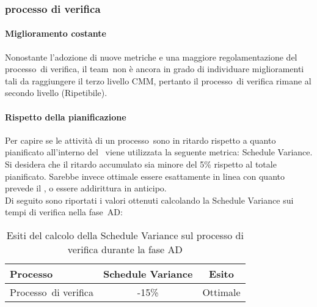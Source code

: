 \documentclass[../PianoDiQualifica.tex]{subfiles}
\begin{document}
\begin{appendices}
		\subsubsection{processo di verifica}
			\paragraph{Miglioramento costante}
			Nonostante l'adozione di nuove metriche e una maggiore regolamentazione del processo\g\ di verifica, il team\g\ non è ancora in grado di individuare miglioramenti tali da raggiungere il terzo livello CMM\g, pertanto il processo\g\ di verifica rimane al secondo livello (Ripetibile).
			
			\paragraph{Rispetto della pianificazione}
			Per capire se le attività di un processo\g\ sono in ritardo rispetto a quanto pianificato all’interno del \pianodiprogetto\ viene utilizzata la seguente metrica: Schedule Variance.\\
			Si desidera che il ritardo accumulato sia minore del 5\% rispetto al totale pianificato. Sarebbe invece ottimale essere esattamente in linea con quanto prevede il \pianodiprogetto, o essere addirittura in anticipo.\\
			Di seguito sono riportati i valori ottenuti calcolando la Schedule Variance sui tempi di verifica nella fase\g\ AD:
			\begin{table}[H]
				\centering
				\begin{tabular}{l * {2}{c}}
					\toprule
					\textbf{Processo} & \textbf{Schedule Variance} & \textbf{Esito} \\
					\midrule
					Processo\g\ di verifica & -15\% &  Ottimale \\
					\bottomrule
				\end{tabular}
				\caption{Esiti del calcolo della Schedule Variance sul processo di verifica durante la fase AD}
				\label{tab:esiti_schedule_variance}
			\end{table}
			

\end{appendices}
\end{document}
